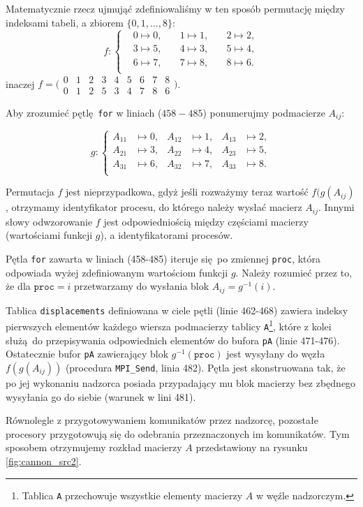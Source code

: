 Matematycznie rzecz ujmująć zdefiniowaliśmy w ten sposób permutację między indeksami tabeli, a zbiorem \(\{0, 1, \dots, 8\}\):
\begin{equation*}
f\colon \left\{\begin{aligned}
& 0\mapsto 0, & \quad 1\mapsto 1, & \quad 2\mapsto 2, \\
& 3\mapsto 5, & \quad 4\mapsto 3, & \quad 5\mapsto 4, \\
& 6\mapsto 7, & \quad 7\mapsto 8, & \quad 8\mapsto 6. \\
\end{aligned}\right.
\end{equation*}
inaczej \(f=\bigl(\begin{smallmatrix}
  0 & 1 & 2 & 3 & 4 & 5 & 6 & 7 & 8\\
  0 & 1 & 2 & 5 & 3 & 4 & 7 & 8 & 6
\end{smallmatrix}\bigr)\).

\noindent Aby zrozumieć pętlę \texttt{for} w liniach (\(458-485\)) 
ponumerujmy podmacierze \(A_{ij}\):

\begin{equation*}
g\colon \left\{\begin{aligned}
A_{11}&\mapsto 0, & A_{12}&\mapsto 1, & A_{13}&\mapsto 2, \\
A_{21}&\mapsto 3, & A_{22}&\mapsto 4, & A_{23}&\mapsto 5, \\
A_{31}&\mapsto 6, & A_{32}&\mapsto 7, & A_{33}&\mapsto 8. \\
\end{aligned}\right.
\end{equation*}


Permutacja \(f\) jest nieprzypadkowa, gdyż jeśli rozważymy teraz wartość \(f(g(A_{ij})\), otrzymamy identyfikator procesu, do którego należy wysłać macierz \(A_{ij}\). Innymi słowy odwzorowanie \(f\) jest odpowiedniością między częściami macierzy (wartościami funkcji \(g\)), a identyfikatorami procesów.

Pętla \texttt{for} zawarta w liniach (458-485) iteruje się po zmiennej \texttt{proc}, która odpowiada wyżej zdefiniowanym wartościom funkcji \(g\). Należy rozumieć przez to, że dla \(\mathtt{proc}=i\) przetwarzamy do wysłania blok \(A_{ij}=g^{-1}(i)\).


Tablica \texttt{displacements} definiowana w ciele pętli (linie 462-468) zawiera indeksy pierwszych elementów każdego wiersza podmacierzy tablicy \texttt{A}\footnote{Tablica \texttt{A} przechowuje wszystkie elementy macierzy \(A\) w węźle nadzorczym.}, które z kolei służą do przepisywania odpowiednich elementów do bufora \texttt{pA} (linie 471-476). Ostatecznie bufor \texttt{pA} zawierający blok \(g^{-1}(\mathtt{proc})\) jest wysyłany do węzła \(f(g(A_{ij}))\) (procedura \texttt{MPI\_Send}, linia 482). Pętla jest skonstruowana tak, że po jej wykonaniu nadzorca posiada przypadający mu blok macierzy bez zbędnego wysyłania go do siebie (warunek w lini 481). 


Równolegle z przygotowywaniem komunikatów przez nadzorcę, pozostałe procesory przygotowują się do odebrania przeznaczonych im komunikatów. Tym sposobem otrzymujemy rozkład macierzy \(A\) przedstawiony na rysunku \ref{fig:cannon_src2}.